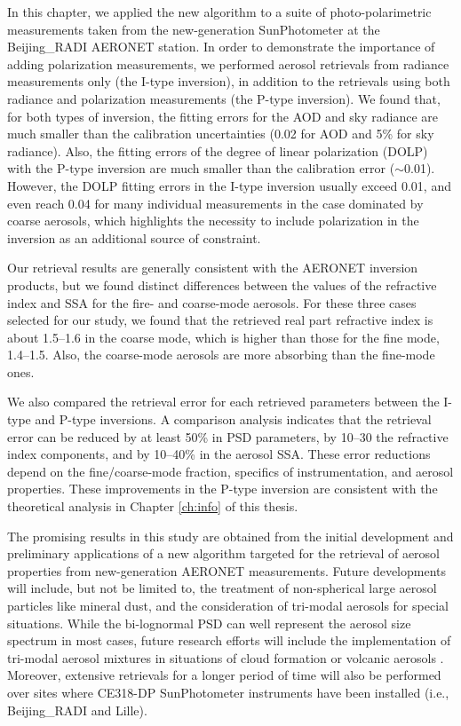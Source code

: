 In this chapter, we applied the new algorithm to a suite of photo-polarimetric
measurements taken from the new-generation SunPhotometer at the Beijing\_RADI
AERONET station. In order to demonstrate the importance of adding polarization
measurements, we performed aerosol retrievals from radiance measurements only
(the I-type inversion), in addition to the retrievals using both radiance and
polarization measurements (the P-type inversion). We found that, for both types
of inversion, the fitting errors for the AOD and sky radiance are much smaller
than the calibration uncertainties (0.02 for AOD and 5\% for sky radiance).
Also, the fitting errors of the degree of linear polarization (DOLP) with the
P-type inversion are much smaller than the calibration error ($\sim$0.01). However,
the DOLP fitting errors in the I-type inversion usually exceed 0.01, and even
reach 0.04 for many individual measurements in the case dominated by coarse
aerosols, which highlights the necessity to include polarization in the
inversion as an additional source of constraint.

Our retrieval results are generally consistent with the AERONET inversion
products, but we found distinct differences between the values of the
refractive index and SSA for the fire- and coarse-mode aerosols. For these
three cases selected for our study, we found that the retrieved real part
refractive index is about 1.5--1.6 in the coarse mode, which is higher than
those for the fine mode, 1.4--1.5. Also, the coarse-mode aerosols are more
absorbing than the fine-mode ones.

We also compared the retrieval error for each retrieved parameters between the
I-type and P-type inversions. A comparison analysis indicates that the
retrieval error can be reduced by at least 50\% in PSD parameters, by 10–30%
the refractive index components, and by 10--40\% in the aerosol SSA. These error
reductions depend on the fine/coarse-mode fraction, specifics of
instrumentation, and aerosol properties. These improvements in the P-type
inversion are consistent with the theoretical analysis in Chapter \ref{ch:info}
of this thesis.

The promising results in this study are obtained from the initial development
and preliminary applications of a new algorithm targeted for the retrieval of
aerosol properties from new-generation AERONET measurements. Future
developments will include, but not be limited to, the treatment of
non-spherical large aerosol particles like mineral dust, and the consideration
of tri-modal aerosols for special situations. While the bi-lognormal PSD can
well represent the aerosol size spectrum in most cases, future research efforts 
will include the implementation of tri-modal aerosol mixtures in situations of
cloud formation \citep{Eck12} or volcanic aerosols \citep{Eck10}.
Moreover, extensive retrievals for a longer period of time will also be
performed over sites where CE318-DP SunPhotometer instruments have been
installed (i.e., Beijing\_RADI and Lille).

